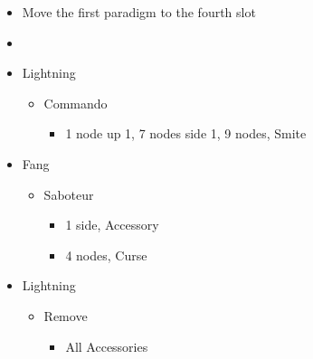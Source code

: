 \begin{menu}
  \begin{multicols}{2}
    \begin{itemize}
      \paradigm
      \begin{itemize}
        \item Move the first paradigm to the fourth slot
        \item {}%
              {\paradigmline{(\rav)}{\syn}{\sab}}%
              {\paradigmline{(\rav)}{\rav}{(\sab)}}%
              {\paradigmline{(\rav)}{(\rav)}{\sen}}%
              {\paradigmline[4]{\textit{\rav}}{\textit{\rav}}{\textit{\com}}}%
              {\paradigmline{[\com]}{\rav}{\com}}%
              {\paradigmline{[\com]}{\rav}{\com}}
      \end{itemize}
      \crystarium
      \begin{itemize}
        \item Lightning
              \begin{itemize}
                \item Commando
                      \begin{itemize}
                        \item 1 node up 1, 7 nodes side 1, 9 nodes, Smite
                      \end{itemize}
              \end{itemize}
        \item Fang
              \begin{itemize}
                \item Saboteur
                      \begin{itemize}
                        \item 1 side, Accessory
                        \item 4 nodes, Curse
                      \end{itemize}
              \end{itemize}
      \end{itemize}
      \columnbreak
      \equip
      \begin{itemize}
        \item Lightning
              \begin{itemize}
                \item Remove
                      \begin{itemize}
                        \item All Accessories

\end{itemize}
\end{itemize}
\end{itemize}
\end{itemize}
\end{multicols}
\end{menu}
